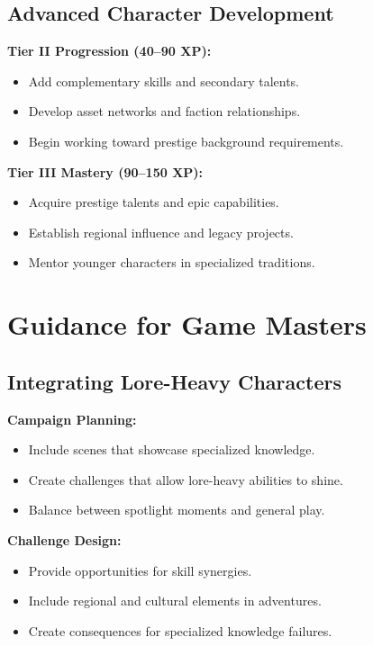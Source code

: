\subsection{Advanced Character Development}\label{subsec:advanced_development}

\textbf{Tier II Progression (40--90 XP):}
\begin{itemize}
    \item Add complementary skills and secondary talents.
    \item Develop asset networks and faction relationships.
    \item Begin working toward prestige background requirements.
\end{itemize}

\textbf{Tier III Mastery (90--150 XP):}
\begin{itemize}
    \item Acquire prestige talents and epic capabilities.
    \item Establish regional influence and legacy projects.
    \item Mentor younger characters in specialized traditions.
\end{itemize}

\section{Guidance for Game Masters}\label{sec:gm_guidance}

\subsection{Integrating Lore-Heavy Characters}\label{subsec:integration_guidance}

\textbf{Campaign Planning:}
\begin{itemize}
    \item Include scenes that showcase specialized knowledge.
    \item Create challenges that allow lore-heavy abilities to shine.
    \item Balance between spotlight moments and general play.
\end{itemize}

\textbf{Challenge Design:}
\begin{itemize}
    \item Provide opportunities for skill synergies.
    \item Include regional and cultural elements in adventures.
    \item Create consequences for specialized knowledge failures.
\end{itemize}

